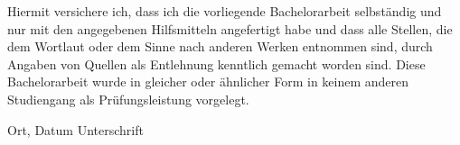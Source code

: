 \documentclass[twoside,12pt,a4paper]{article}
\begin{document}
Hiermit versichere ich, dass ich die vorliegende Bachelorarbeit 
selbst\"andig und nur mit den angegebenen Hilfsmitteln angefertigt habe und dass alle Stellen, die dem Wortlaut oder dem 
Sinne nach anderen Werken entnommen sind, durch Angaben von Quellen als 
Entlehnung kenntlich gemacht worden sind. 
Diese Bachelorarbeit wurde in gleicher oder \"ahnlicher Form in keinem anderen 
Studiengang als Pr\"ufungsleistung vorgelegt. 

\vskip 3cm

Ort, Datum	\hfill Unterschrift \hfill 


\end{document}
